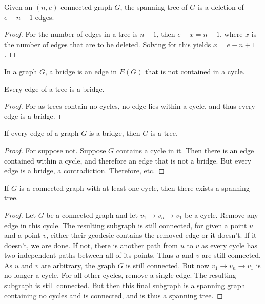         \begin{theorem}
        Given an $(n,e)$ connected graph $G$, the spanning tree of $G$ is a deletion of $e-n+1$ edges.
        \end{theorem}
        \begin{proof}
        For the number of edges in a tree is $n-1$, then $e-x = n-1$, where $x$ is the number of edges that are to be deleted. Solving for this yields $x=e-n+1$.
        \end{proof}
        \begin{definition}
        In a graph $G$, a bridge is an edge in $E(G)$ that is not contained in a cycle.
        \end{definition}
        \begin{theorem}
        Every edge of a tree is a bridge.
        \end{theorem}
        \begin{proof}
        For as trees contain no cycles, no edge lies within a cycle, and thus every edge is a bridge.
        \end{proof}
        \begin{theorem}
        If every edge of a graph $G$ is a bridge, then $G$ is a tree.
        \end{theorem}
        \begin{proof}
        For suppose not. Suppose $G$ contains a cycle in it. Then there is an edge contained within a cycle, and therefore an edge that is not a bridge. But every edge is a bridge, a contradiction. Therefore, etc.
        \end{proof}
        \begin{theorem}
        If $G$ is a connected graph with at least one cycle, then there exists a spanning tree.
        \end{theorem}
        \begin{proof}
        Let $G$ be a connected graph and let $v_1 \rightarrow v_n\rightarrow v_1$ be a cycle. Remove any edge in this cycle. The resulting subgraph is still connected, for given a point $u$ and a point $v$, either their geodesic contains the removed edge or it doesn't. If it doesn't, we are done. If not, there is another path from $u$ to $v$ as every cycle has two independent paths between all of its points. Thus $u$ and $v$ are still connected. As $u$ and $v$ are arbitrary, the graph $G$ is still connected. But now $v_1\rightarrow v_n \rightarrow v_1$ is no longer a cycle. For all other cycles, remove a single edge. The resulting subgraph is still connected. But then this final subgraph is a spanning graph containing no cycles and is connected, and is thus a spanning tree.
        \end{proof}

